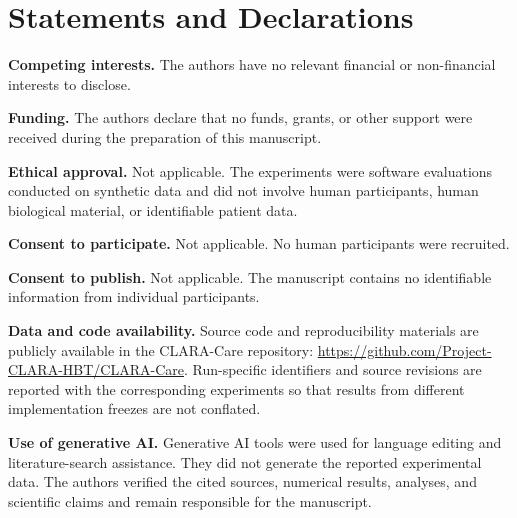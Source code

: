 \documentclass[11pt]{article}
\begin{document}
\section*{Statements and Declarations}
\textbf{Competing interests.} The authors have no relevant financial or non-financial interests to disclose.

\textbf{Funding.} The authors declare that no funds, grants, or other support were received during the preparation of this manuscript.

\textbf{Ethical approval.} Not applicable. The experiments were software evaluations conducted on synthetic data and did not involve human participants, human biological material, or identifiable patient data.

\textbf{Consent to participate.} Not applicable. No human participants were recruited.

\textbf{Consent to publish.} Not applicable. The manuscript contains no identifiable information from individual participants.

\textbf{Data and code availability.} Source code and reproducibility materials are publicly available in the CLARA-Care repository: \url{https://github.com/Project-CLARA-HBT/CLARA-Care}. Run-specific identifiers and source revisions are reported with the corresponding experiments so that results from different implementation freezes are not conflated.

\textbf{Use of generative AI.} Generative AI tools were used for language editing and literature-search assistance. They did not generate the reported experimental data. The authors verified the cited sources, numerical results, analyses, and scientific claims and remain responsible for the manuscript.
\end{document}
